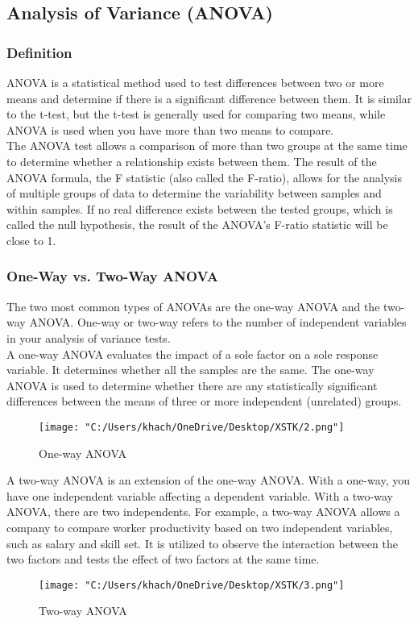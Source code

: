 \documentclass[a4paper]{article}
\begin{document}
	\subsection{Analysis of Variance (ANOVA)}
	\subsubsection{Definition}
	ANOVA is a statistical method used to test differences between two or more means and determine if there is a significant difference between them. It is similar to the t-test, but the t-test is generally used for comparing two means, while ANOVA is used when you have more than two means to compare.\\
	The ANOVA test allows a comparison of more than two groups at the same time to determine whether a relationship exists between them. The result of the ANOVA formula, the F statistic (also called the F-ratio), allows for the analysis of multiple groups of data to determine the variability between samples and within samples. If no real difference exists between the tested groups, which is called the null hypothesis, the result of the ANOVA's F-ratio statistic will be close to 1.
	\subsubsection{One-Way vs. Two-Way ANOVA}
	The two most common types of ANOVAs are the one-way ANOVA and the two-way ANOVA. One-way or two-way refers to the number of independent variables in your analysis of variance tests.\\
	A one-way ANOVA evaluates the impact of a sole factor on a sole response variable. It determines whether all the samples are the same. The one-way ANOVA is used to determine whether there are any statistically significant differences between the means of three or more independent (unrelated) groups.\\
	\begin{figure}[htbp]
		\centering
		\texttt{[image: "C:/Users/khach/OneDrive/Desktop/XSTK/2.png"]}
		\captionsetup{justification=centering}
		\vspace{0.5cm}
		\caption{One-way ANOVA}
		\label{fig:data_table}
	\end{figure}
	\linebreak
	A two-way ANOVA is an extension of the one-way ANOVA. With a one-way, you have one independent variable affecting a dependent variable. With a two-way ANOVA, there are two independents. For example, a two-way ANOVA allows a company to compare worker productivity based on two independent variables, such as salary and skill set. It is utilized to observe the interaction between the two factors and tests the effect of two factors at the same time.
	\begin{figure}[htbp]
		\centering
		\texttt{[image: "C:/Users/khach/OneDrive/Desktop/XSTK/3.png"]}
		\captionsetup{justification=centering}
		\vspace{0.5cm}
		\caption{Two-way ANOVA}
		\label{fig:data_table}
	\end{figure}
\end{document}
